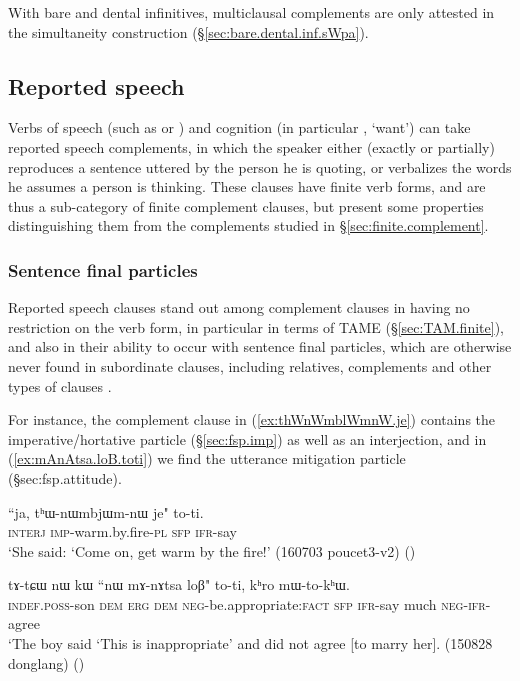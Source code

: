 With bare and dental infinitives, multiclausal complements are only attested in the simultaneity construction (§\ref{sec:bare.dental.inf.sWpa}).

\subsection{Reported speech} \label{sec:reported.speech}
Verbs of speech (such as  or ) and cognition (in particular , `want') can take reported speech complements, in which the speaker either (exactly or partially) reproduces a sentence uttered by the person he is quoting, or verbalizes the words he assumes a person is thinking. These clauses have finite verb forms, and are thus a sub-category of finite complement clauses, but present some properties distinguishing them from the complements studied in §\ref{sec:finite.complement}.

\subsubsection{Sentence final particles} \label{sec:reported.speech.sfp}
Reported speech clauses stand out among complement clauses in having no restriction on the verb form, in particular in terms of TAME (§\ref{sec:TAM.finite}), and also in their ability to occur with sentence final particles, which are otherwise never found in subordinate clauses, including relatives, complements and other types of clauses . 

For instance, the complement clause in (\ref{ex:thWnWmblWmnW.je}) contains the imperative/hortative particle  (§\ref{sec:fsp.imp}) as well as an interjection, and in (\ref{ex:mAnAtsa.loB.toti}) we find the utterance mitigation particle  (§{sec:fsp.attitude}).   

 \begin{exe}
\ex \label{ex:thWnWmblWmnW.je}
 \gll ``ja, tʰɯ-nɯmbjɯm-nɯ je" to-ti. \\
 \textsc{interj} \textsc{imp}-warm.by.fire-\textsc{pl} \textsc{sfp} \textsc{ifr}-say \\
 \glt `She said: `Come on, get warm by the fire!' (160703 poucet3-v2)
 ()
 \end{exe} 
 
 \begin{exe}
\ex \label{ex:mAnAtsa.loB.toti}
 \gll tɤ-tɕɯ nɯ kɯ ``nɯ mɤ-nɤtsa loβ" to-ti, kʰro mɯ-to-kʰɯ. \\
 \textsc{indef}.\textsc{poss}-son \textsc{dem} \textsc{erg} \textsc{dem} \textsc{neg}-be.appropriate:\textsc{fact} \textsc{sfp} \textsc{ifr}-say much \textsc{neg}-\textsc{ifr}-agree \\
 \glt `The boy said `This is inappropriate' and did not agree [to marry her]. (150828 donglang)
()
\end{exe} 
  
